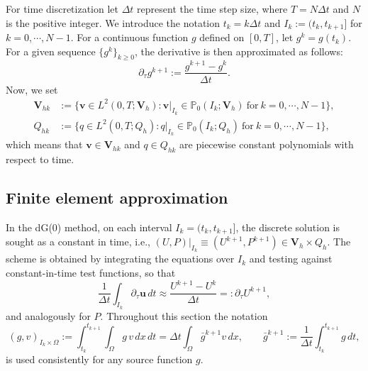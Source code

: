 \documentclass{amsart}
\newcommand{\ta}{\tau}
\newcommand{\LRp}[1]{\left( #1 \right)}
\begin{document}
For time discretization let $\Delta t$ represent the time step size, where $T=N\Delta t$ and $N$ is the positive integer. We introduce the notation $t_k=k\Delta t$ and $I_k := (t_{k}, t_{k+1}]$ for $k=0,\cdots,N-1$. For a continuous function $g$ defined on $[0,T]$, let $g^k=g(t_k)$. For a given sequence $\{g^k\}_{k\ge 0}$, the derivative is then approximated as follows:
\[\partial_\ta g^{k+1}:=\frac{g^{k+1}-g^k}{\Delta t}.\]
Now, we set
\begin{align*}
	\boldsymbol{V}_{hk} &:= \{\boldsymbol{v} \in L^2(0,T; \boldsymbol{V}_h): \boldsymbol{v}|_{I_{k}} \in \mathbb{P}_{0}(I_k; \boldsymbol{V}_h) \ \text{for} \ k = 0,\cdots,N-1\},
    \\
	Q_{hk} &:= \{q \in L^2(0,T; Q_h) : q|_{I_{k}} \in \mathbb{P}_{0}(I_k; Q_h) \ \text{for} \ k = 0,\cdots,N-1\},
\end{align*}
which means that $\boldsymbol{v} \in \boldsymbol{V}_{hk}$ and $q \in Q_{hk}$ are piecewise constant polynomials with respect to time.
\subsection{Finite element approximation}\label{Finite element approximation:}
In the dG(0) method, on each interval $I_k = (t_k, t_{k+1}]$, the discrete solution is sought as a constant in time, i.e., $(U,P)|_{I_k} \equiv (U^{k+1}, P^{k+1}) \in \boldsymbol{V}_h \times Q_h$. The scheme is obtained by integrating the equations over $I_k$ and testing against constant-in-time test functions, so that
\[
  \frac{1}{\Delta t}\int_{I_k} \partial_{\tau} \boldsymbol{u}\,dt \approx \frac{U^{k+1}-U^k}{\Delta t} =: \partial_\tau U^{k+1},
\]
and analogously for $P$. Throughout this section the notation
\[
  \LRp{g, v}_{I_k \times \Omega} := \int_{t_k}^{t_{k+1}}\int_{\Omega} g\, v\,dx\,dt = \Delta t \int_\Omega \bar{g}^{k+1} v\,dx,
  \qquad \bar{g}^{k+1} := \frac{1}{\Delta t}\int_{t_k}^{t_{k+1}} g\,dt,
\]
is used consistently for any source function $g$.
\end{document}
